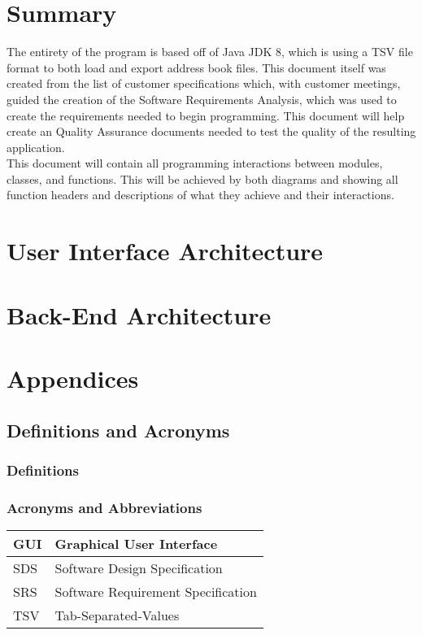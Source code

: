 \documentclass[a4paper, 11pt]{article}
\begin{document}
\section{Summary}
The entirety of the program is based off of Java JDK 8, which is using a TSV file format to both load and export address book files. This document itself was created from the list of customer specifications which, with customer meetings, guided the creation of the Software Requirements Analysis, which was used to create the requirements needed to begin programming. This document will help create an Quality Assurance documents needed to test the quality of the resulting application. \\
This document will contain all programming interactions between modules, classes, and functions. This will be achieved by both diagrams and showing all function headers and descriptions of what they achieve and their interactions.
\section{User Interface Architecture}
\section{Back-End Architecture}




\section{Appendices}

\subsection{Definitions and Acronyms}
\subsubsection{Definitions}
\subsubsection{Acronyms and Abbreviations}

	\begin{tabular}{ | m{1cm} | m{10cm} | } 
		\hline
		GUI & Graphical User Interface \\
		\hline
		SDS & Software Design Specification \\
		\hline
		SRS & Software Requirement Specification  \\
		\hline
		TSV & Tab-Separated-Values \\
		\hline
	\end{tabular}
\end{document}
